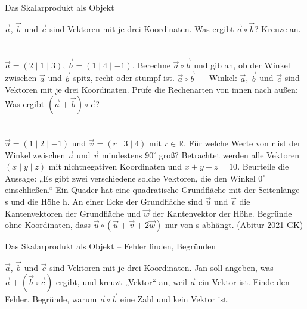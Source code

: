 \setcounter{aufgabe}{8}

\begin{aufgabe}{Das Skalarprodukt als Objekt}
\begin{teile}
\teil $\vec a$, $\vec b$ und $\vec c$ sind Vektoren mit je drei Koordinaten. Was ergibt $\vec a \circ \vec b$? Kreuze an. \\  \\  \\ 
\teil $\vec a = (2 \mid 1 \mid 3)$, $\vec b = (1 \mid 4 \mid -1)$. Berechne $\vec a \circ \vec b$ und gib an, ob der Winkel zwischen $\vec a$ und $\vec b$ spitz, recht oder stumpf ist. $\vec a \circ \vec b =$ \leerfeld \quad Winkel: \leerfeld
\teil $\vec a$, $\vec b$ und $\vec c$ sind Vektoren mit je drei Koordinaten. Prüfe die Rechenarten von innen nach außen: Was ergibt $(\vec a + \vec b) \circ \vec c$? \\  \\  \\ 
\teil $\vec u = (1 \mid 2 \mid -1)$ und $\vec v = (r \mid 3 \mid 4)$ mit $r \in \mathbb{R}$. Für welche Werte von r ist der Winkel zwischen $\vec u$ und $\vec v$ mindestens $90^\circ$ groß? \leerfeld
\teil Betrachtet werden alle Vektoren $(x \mid y \mid z)$ mit nichtnegativen Koordinaten und $x + y + z = 10$. Beurteile die Aussage: „Es gibt zwei verschiedene solche Vektoren, die den Winkel $0^\circ$ einschließen.“
\teil Ein Quader hat eine quadratische Grundfläche mit der Seitenlänge s und die Höhe h. An einer Ecke der Grundfläche sind $\vec u$ und $\vec v$ die Kantenvektoren der Grundfläche und $\vec w$ der Kantenvektor der Höhe. Begründe ohne Koordinaten, dass $\vec u \circ (\vec u + \vec v + 2\vec w)$ nur von s abhängt. \hfill (Abitur 2021 GK)
\end{teile}
\end{aufgabe}

\begin{aufgabe}{Das Skalarprodukt als Objekt – Fehler finden, Begründen}
\begin{teile}
\teil $\vec a$, $\vec b$ und $\vec c$ sind Vektoren mit je drei Koordinaten. Jan soll angeben, was $\vec a + (\vec b \circ \vec c)$ ergibt, und kreuzt „Vektor“ an, weil $\vec a$ ein Vektor ist. Finde den Fehler.
\teil Begründe, warum $\vec a \circ \vec b$ eine Zahl und kein Vektor ist.
\end{teile}
\end{aufgabe}

